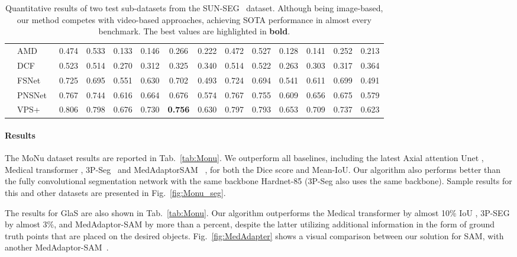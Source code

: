 \documentclass[runningheads]{llncs}
\begin{document}
\begin{table*}[t!]
\begin{center}
\begin{adjustbox}{width=1\columnwidth}
\begin{tabular}{c lcccccc cccccc}
    & AMD~\cite{liu2021emergence} & 0.474 & 0.533 & 0.133 & 0.146 & 0.266 & 0.222 & 0.472 & 0.527 & 0.128 & 0.141 & 0.252 & 0.213 \\
    & DCF~\cite{zhang2021dynamic} & 0.523 & 0.514 & 0.270 & 0.312 & 0.325 & 0.340 & 0.514 & 0.522 & 0.263 & 0.303 & 0.317 & 0.364 \\
    & FSNet~\cite{ji2021full} & 0.725 & 0.695 & 0.551 & 0.630 & 0.702 & 0.493 & 0.724 & 0.694 & 0.541 & 0.611 & 0.699 & 0.491 \\
    & PNSNet~\cite{ji2021pnsnet} & 0.767 & 0.744 & 0.616 & 0.664 & 0.676 & 0.574 & 0.767 & 0.755 & 0.609 & 0.656 & 0.675 & 0.579 \\
& VPS+~\cite{ji2022video} & 0.806 & 0.798 & 0.676 & 0.730 & \textbf{0.756} & 0.630& 0.797 & 0.793 & 0.653 & 0.709 & 0.737 & 0.623 \\
    \bottomrule
    \end{tabular}
    \end{adjustbox}
    \end{center}

    \caption{Quantitative results of two test sub-datasets from the SUN-SEG~\cite{ji2022video} dataset. Although being image-based, our method competes with video-based approaches, achieving SOTA performance in almost every benchmark. The best values are highlighted in \textbf{bold}.} 
    \label{tab:video}

\end{table*}

\paragraph{Results} The MoNu dataset results are reported in Tab.~\ref{tab:Monu}. We outperform all baselines, {including the latest Axial attention Unet \cite{wang2020axial}, Medical transformer \cite{valanarasu2021medical}, 3P-Seg~\cite{shaharabany2022end} and MedAdaptorSAM~\cite{wu2023medical}} , for both the Dice score and Mean-IoU. Our algorithm also performs better than the fully convolutional segmentation network with the same backbone Hardnet-85 (3P-Seg also uses the same backbone). Sample results for this and other datasets are presented in  Fig.~\ref{fig:Monu_seg}. 

The results for GlaS are also shown in Tab.~\ref{tab:Monu}. Our algorithm outperforms the Medical transformer by almost 10\% IoU \cite{shaharabany2022end}, 3P-SEG by almost 3\%, and MedAdaptor-SAM by more than a percent, despite the latter utilizing additional information in the form of ground truth points that are placed on the desired objects. Fig.~\ref{fig:MedAdapter} shows a visual comparison between our solution for SAM, with another MedAdaptor-SAM~\cite{wu2023medical}.
\end{document}
